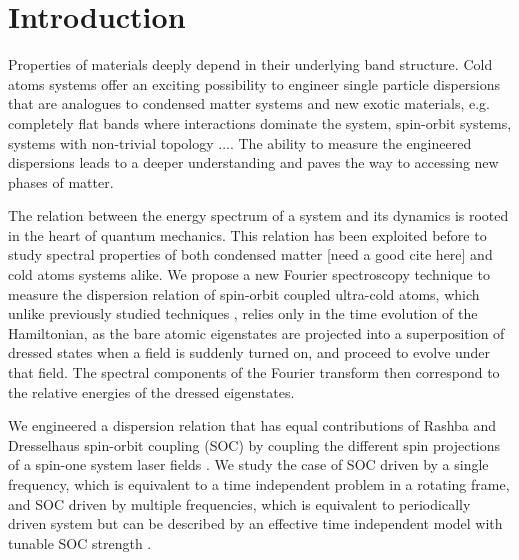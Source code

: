 \section{Introduction}

Properties of materials deeply depend in their underlying band structure. Cold atoms systems offer an exciting possibility to engineer single particle dispersions that are analogues to condensed matter systems and new exotic materials, e.g. completely flat bands where interactions dominate the system, spin-orbit systems, systems with non-trivial topology \cite{lindner_floquet_2011,radic_strong_2015}.... The ability to measure the engineered dispersions leads to a deeper understanding and paves the way to accessing new phases of matter. 
 
The relation between the energy spectrum of a system and its dynamics is rooted in the heart of quantum mechanics.  This relation has been exploited before to study spectral properties of both condensed matter [need a good cite here] and cold atoms systems \cite{yoshimura_diabatic-ramping_2014,wang_atom-interferometric_2015} alike. We propose a new Fourier spectroscopy technique to measure the dispersion relation of spin-orbit coupled ultra-cold atoms, which unlike previously studied techniques \cite{cheuk_spin-injection_2012}, relies only in the time evolution of the Hamiltonian, as the bare atomic eigenstates are projected into a superposition of dressed states when a field is suddenly turned on, and proceed to evolve under that field. The spectral components of the Fourier transform then correspond to the relative energies of the dressed eigenstates. %

We engineered a dispersion relation that has equal contributions of Rashba and Dresselhaus spin-orbit coupling (SOC) by coupling the different spin projections of a spin-one system laser fields \cite{dalibard_textitcolloquium_2011}. We study the case of SOC driven by a single frequency, which is equivalent to a time independent problem in a rotating frame, and SOC driven by multiple frequencies, which is equivalent to periodically driven system but can be described by an effective time independent model with tunable SOC strength \cite{jimenez-garcia_tunable_2015}.

